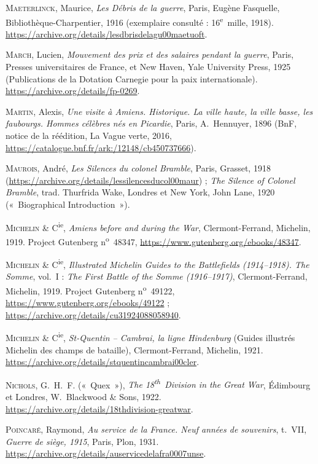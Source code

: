 \begin{biblist}
\item \textsc{Maeterlinck}, Maurice, \textit{Les Débris de la guerre}, Paris, Eugène Fasquelle, Bibliothèque-Charpentier, 1916 (exemplaire consulté : 16\textsuperscript{e}~mille, 1918). \url{https://archive.org/details/lesdbrisdelagu00maetuoft}.
\item \textsc{March}, Lucien, \textit{Mouvement des prix et des salaires pendant la guerre}, Paris, Presses universitaires de France, et New Haven, Yale University Press, 1925 (Publications de la Dotation Carnegie pour la paix internationale). \url{https://archive.org/details/fp-0269}.
\item \textsc{Martin}, Alexis, \textit{Une visite à Amiens. Historique. La ville haute, la ville basse, les faubourgs. Hommes célèbres nés en Picardie}, Paris, A.~Hennuyer, 1896 (BnF, notice de la réédition, La Vague verte, 2016, \url{https://catalogue.bnf.fr/ark:/12148/cb450737666}).
\item \textsc{Maurois}, André, \textit{Les Silences du colonel Bramble}, Paris, Grasset, 1918 (\url{https://archive.org/details/lessilencesducol00maur}) ; \textit{The Silence of Colonel Bramble}, trad. Thurfrida Wake, Londres et New York, John Lane, 1920 («~Biographical Introduction~»).
\item \textsc{Michelin} \& C\textsuperscript{ie}, \textit{Amiens before and during the War}, Clermont-Ferrand, Michelin, 1919. Project Gutenberg n\textsuperscript{o}~48347, \url{https://www.gutenberg.org/ebooks/48347}.
\item \textsc{Michelin} \& C\textsuperscript{ie}, \textit{Illustrated Michelin Guides to the Battlefields (1914--1918). The Somme}, vol.~I : \textit{The First Battle of the Somme (1916--1917)}, Clermont-Ferrand, Michelin, 1919. Project Gutenberg n\textsuperscript{o}~49122, \url{https://www.gutenberg.org/ebooks/49122} ; \url{https://archive.org/details/cu31924088058940}.
\item \textsc{Michelin} \& C\textsuperscript{ie}, \textit{St-Quentin -- Cambrai, la ligne Hindenburg} (Guides illustrés Michelin des champs de bataille), Clermont-Ferrand, Michelin, 1921. \url{https://archive.org/details/stquentincambrai00cler}.
\item \textsc{Nichols}, G.~H.~F. («~Quex~»), \textit{The 18\textsuperscript{th}~Division in the Great War}, Édimbourg et Londres, W.~Blackwood \& Sons, 1922. \url{https://archive.org/details/18thdivision-greatwar}.
\item \textsc{Poincaré}, Raymond, \textit{Au service de la France. Neuf années de souvenirs}, t.~VII, \textit{Guerre de siège, 1915}, Paris, Plon, 1931. \url{https://archive.org/details/auservicedelafra0007unse}.

\end{biblist}
